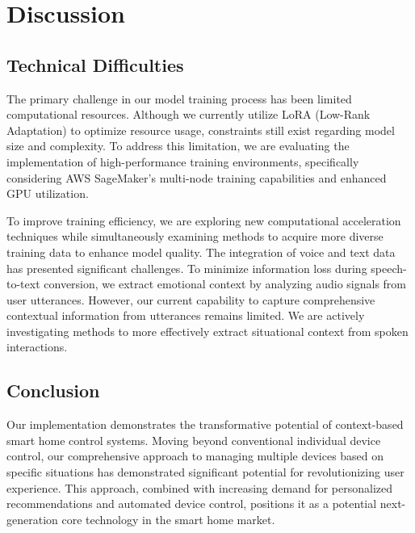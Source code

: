 \documentclass[conference]{IEEEtran}
\begin{document}
\clearpage

\section{Discussion}

\vspace{1em} %

\subsection{Technical Difficulties}
\vspace{0.5em}

The primary challenge in our model training process has been limited computational resources. Although we currently utilize LoRA (Low-Rank Adaptation) to optimize resource usage, constraints still exist regarding model size and complexity. To address this limitation, we are evaluating the implementation of high-performance training environments, specifically considering AWS SageMaker's multi-node training capabilities and enhanced GPU utilization.

To improve training efficiency, we are exploring new computational acceleration techniques while simultaneously examining methods to acquire more diverse training data to enhance model quality. The integration of voice and text data has presented significant challenges. To minimize information loss during speech-to-text conversion, we extract emotional context by analyzing audio signals from user utterances. However, our current capability to capture comprehensive contextual information from utterances remains limited. We are actively investigating methods to more effectively extract situational context from spoken interactions.

\vspace{0.7em} %

\subsection{Conclusion}
\vspace{0.5em}

Our implementation demonstrates the transformative potential of context-based smart home control systems. Moving beyond conventional individual device control, our comprehensive approach to managing multiple devices based on specific situations has demonstrated significant potential for revolutionizing user experience. This approach, combined with increasing demand for personalized recommendations and automated device control, positions it as a potential next-generation core technology in the smart home market.
\end{document}
